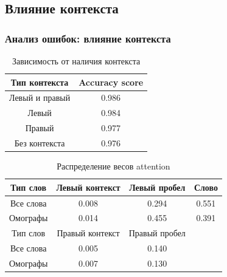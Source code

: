 \documentclass[russian]{beamer}
\begin{document}
\subsection{Влияние контекста}
\begin{frame}
\frametitle{Анализ ошибок: влияние контекста}

\begin{table}[H]
	\caption{Зависимость от наличия контекста}
	\begin{small}
		\begin{center}
			\begin{tabular}{|c | c |}
				\hline
				Тип контекста  & Accuracy score \\ \hline
				Левый и правый & 0.986          \\ \hline
				Левый      & 0.984          \\ \hline
				Правый     & 0.977          \\ \hline
				Без контекста  & 0.976          \\ \hline
			\end{tabular}
		\end{center}
	\end{small}
\end{table}

\begin{table}[H]
	\caption{Распределение весов attention}
	\begin{small}
		\begin{center}
			\begin{tabular}{|c | c | c | c |}
				\hline
				Тип слов  & Левый контекст & Левый пробел & Слово\\ \hline
				Все слова & 0.008          & 0.294        & 0.551          \\ \hline
				Омографы  & 0.014          & 0.455        & 0.391           \\ \hline
				Тип слов  &  Правый контекст & Правый пробел & \\ \hline
				Все слова &  0.005   &     0.140         &   \\ \hline
				Омографы &  0.007  &      0.130         &    \\ \hline
			\end{tabular}
		\end{center}
	\end{small}
\end{table}

\end{frame}
\end{document}
